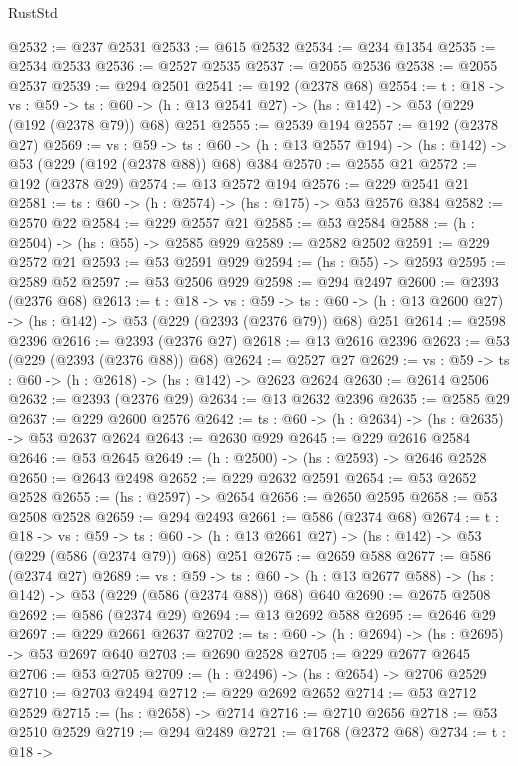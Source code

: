 \begin{lexlean}{RustStd}
\begin{coremodule}
@2532 := @237 @2531
@2533 := @615 @2532
@2534 := @234 @1354
@2535 := @2534 @2533
@2536 := @2527 @2535
@2537 := @2055 @2536
@2538 := @2055 @2537
@2539 := @294 @2501
@2541 := @192 (@2378 @68)
@2554 := {t : @18} ->
  {vs : @59} ->
  {ts : @60} -> (h : @13 @2541 @27) -> (hs : @142) -> @53 (@229 (@192 (@2378 @79)) @68) @251
@2555 := @2539 @194
@2557 := @192 (@2378 @27)
@2569 := {vs : @59} ->
  {ts : @60} -> (h : @13 @2557 @194) -> (hs : @142) -> @53 (@229 (@192 (@2378 @88)) @68) @384
@2570 := @2555 @21
@2572 := @192 (@2378 @29)
@2574 := @13 @2572 @194
@2576 := @229 @2541 @21
@2581 := {ts : @60} -> (h : @2574) -> (hs : @175) -> @53 @2576 @384
@2582 := @2570 @22
@2584 := @229 @2557 @21
@2585 := @53 @2584
@2588 := (h : @2504) -> (hs : @55) -> @2585 @929
@2589 := @2582 @2502
@2591 := @229 @2572 @21
@2593 := @53 @2591 @929
@2594 := (hs : @55) -> @2593
@2595 := @2589 @52
@2597 := @53 @2506 @929
@2598 := @294 @2497
@2600 := @2393 (@2376 @68)
@2613 := {t : @18} ->
  {vs : @59} ->
  {ts : @60} -> (h : @13 @2600 @27) -> (hs : @142) -> @53 (@229 (@2393 (@2376 @79)) @68) @251
@2614 := @2598 @2396
@2616 := @2393 (@2376 @27)
@2618 := @13 @2616 @2396
@2623 := @53 (@229 (@2393 (@2376 @88)) @68)
@2624 := @2527 @27
@2629 := {vs : @59} -> {ts : @60} -> (h : @2618) -> (hs : @142) -> @2623 @2624
@2630 := @2614 @2506
@2632 := @2393 (@2376 @29)
@2634 := @13 @2632 @2396
@2635 := @2585 @29
@2637 := @229 @2600 @2576
@2642 := {ts : @60} -> (h : @2634) -> (hs : @2635) -> @53 @2637 @2624
@2643 := @2630 @929
@2645 := @229 @2616 @2584
@2646 := @53 @2645
@2649 := (h : @2500) -> (hs : @2593) -> @2646 @2528
@2650 := @2643 @2498
@2652 := @229 @2632 @2591
@2654 := @53 @2652 @2528
@2655 := (hs : @2597) -> @2654
@2656 := @2650 @2595
@2658 := @53 @2508 @2528
@2659 := @294 @2493
@2661 := @586 (@2374 @68)
@2674 := {t : @18} ->
  {vs : @59} ->
  {ts : @60} -> (h : @13 @2661 @27) -> (hs : @142) -> @53 (@229 (@586 (@2374 @79)) @68) @251
@2675 := @2659 @588
@2677 := @586 (@2374 @27)
@2689 := {vs : @59} ->
  {ts : @60} -> (h : @13 @2677 @588) -> (hs : @142) -> @53 (@229 (@586 (@2374 @88)) @68) @640
@2690 := @2675 @2508
@2692 := @586 (@2374 @29)
@2694 := @13 @2692 @588
@2695 := @2646 @29
@2697 := @229 @2661 @2637
@2702 := {ts : @60} -> (h : @2694) -> (hs : @2695) -> @53 @2697 @640
@2703 := @2690 @2528
@2705 := @229 @2677 @2645
@2706 := @53 @2705
@2709 := (h : @2496) -> (hs : @2654) -> @2706 @2529
@2710 := @2703 @2494
@2712 := @229 @2692 @2652
@2714 := @53 @2712 @2529
@2715 := (hs : @2658) -> @2714
@2716 := @2710 @2656
@2718 := @53 @2510 @2529
@2719 := @294 @2489
@2721 := @1768 (@2372 @68)
@2734 := {t : @18} ->

\end{coremodule}
\end{lexlean}
